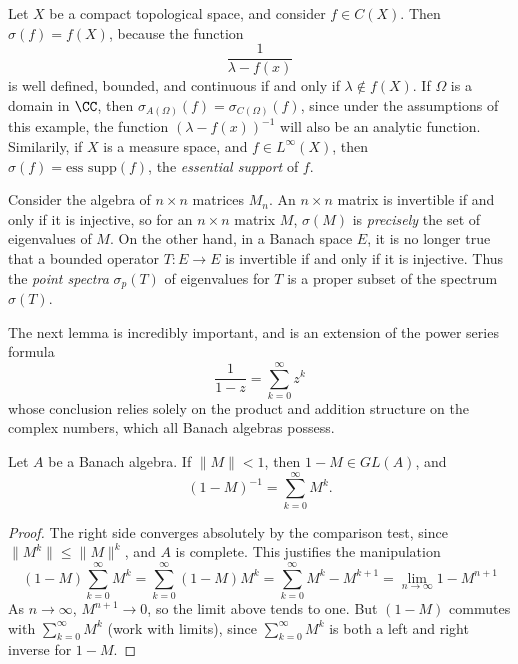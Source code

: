 \begin{example}
    Let $X$ be a compact topological space, and consider $f \in C(X)$. Then $\sigma(f) = f(X)$, because the function
    \[ \frac{1}{\lambda - f(x)} \]
    is well defined, bounded, and continuous if and only if $\lambda \not \in f(X)$. If $\Omega$ is a domain in $\CC$, then $\sigma_{A(\Omega)}(f) = \sigma_{C(\Omega)}(f)$, since under the assumptions of this example, the function $(\lambda - f(x))^{-1}$ will also be an analytic function. Similarily, if $X$ is a measure space, and $f \in L^\infty(X)$, then $\sigma(f) = \text{ess supp}(f)$, the \emph{essential support} of $f$.
\end{example}

\begin{example}
    Consider the algebra of $n \times n$ matrices $M_n$. An $n \times n$ matrix is invertible if and only if it is injective, so for an $n \times n$ matrix $M$, $\sigma(M)$ is \emph{precisely} the set of eigenvalues of $M$. On the other hand, in a Banach space $E$, it is no longer true that a bounded operator $T: E \to E$ is invertible if and only if it is injective. Thus the \emph{point spectra} $\sigma_p(T)$ of eigenvalues for $T$ is a proper subset of the spectrum $\sigma(T)$.
\end{example}

The next lemma is incredibly important, and is an extension of the power series formula
%
\[ \frac{1}{1 - z} = \sum_{k = 0}^\infty z^k \]
%
whose conclusion relies solely on the product and addition structure on the complex numbers, which all Banach algebras possess.

\begin{lemma}
    Let $A$ be a Banach algebra. If $\|M\| < 1$, then $1 - M \in GL(A)$, and
    \[ (1 - M)^{-1} = \sum_{k = 0}^\infty M^k. \]
\end{lemma}
\begin{proof}
    The right side converges absolutely by the comparison test, since $\| M^k \| \leq \| M \|^k$, and $A$ is complete. This justifies the manipulation
    \[ (1 - M) \sum_{k = 0}^\infty M^k = \sum_{k = 0}^\infty (1 - M)M^k = \sum_{k = 0}^\infty M^k - M^{k+1} = \lim_{n \to \infty} 1 - M^{n+1} \]
    As $n \to \infty$, $M^{n+1} \to 0$, so the limit above tends to one. But $(1 - M)$ commutes with $\sum_{k = 0}^\infty M^k$ (work with limits), since $\sum_{k = 0}^\infty M^k$ is both a left and right inverse for $1 - M$.
\end{proof}

